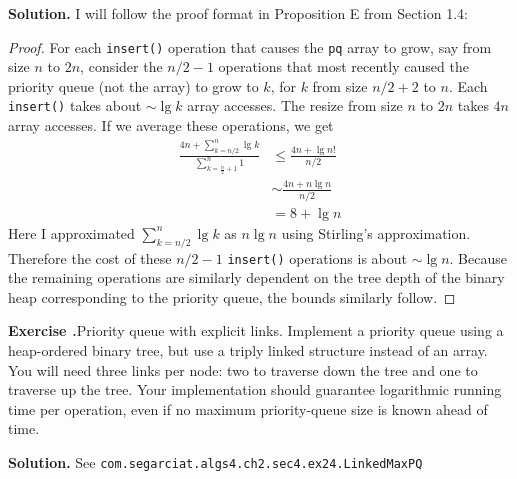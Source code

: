 \documentclass[12pt, a4paper]{article}
\newenvironment{ex}[2][Exercise]
{\par\medskip\noindent \textbf{#1 #2.}}
{\medskip}
\newenvironment{sol}[1][Solution]
{\par\medskip\noindent \textbf{#1.} }
{\medskip}
\begin{document}
	\begin{sol}
		I will follow the proof format in Proposition E from Section 1.4:
		\begin{proof}
			For each \texttt{insert()} operation that causes the \texttt{pq}
			array to grow, say from size $n$ to $2n$, consider the $n/2 - 1$
			operations that most recently caused the priority queue (not
			the array) to grow to $k$, for $k$ from size $n/2 +2$ to $n$.
			Each \texttt{insert()} takes about $\sim \lg k$ array accesses.
			The resize from size $n$ to $2n$ takes $4n$ array accesses.
			If we average these operations, we get
			\begin{align*}
				\frac{4n + \sum_{k=n/2}^{n}\lg k}{\sum_{k = \frac{n}{2} + 1}^{n}1}
				&\leq \frac{4n+\lg n!}{n/2}\\
				&\sim \frac{4n+n\lg n}{n / 2}\\
				&=8+\lg n
			\end{align*}
			Here I approximated $\sum_{k=n/2}^{n}\lg k$ as $n\lg n$ using Stirling's
			approximation. Therefore the cost of these $n / 2 - 1$ \texttt{insert()}
			operations is about $\sim \lg n$. Because the remaining operations
			are similarly dependent on the tree depth of the binary heap
			corresponding to the priority queue, the bounds similarly follow.
		\end{proof}
	\end{sol}
	\begin{ex}{24}
		\emph{Priority queue with explicit links}. Implement a priority queue
		using a heap-ordered binary tree, but use a triply linked structure instead
		of an array. You will need three links per node: two to traverse down the
		tree and one to traverse up the tree. Your implementation should guarantee
		logarithmic running time per operation, even if no maximum priority-queue
		size is known ahead of time.
	\end{ex}
	\begin{sol}
		See \texttt{com.segarciat.algs4.ch2.sec4.ex24.LinkedMaxPQ}
	\end{sol}
	
\end{document}
